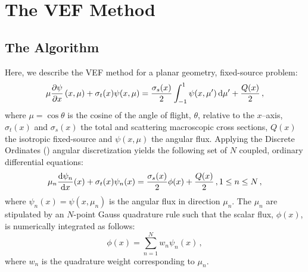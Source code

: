 
\newcommand{\rell}{^\ell} %
\newcommand{\relll}{^{\ell+1}} %
\newcommand{\rellh}{^{\ell+1/2}} %

\newcommand{\paren}[1]{\left(#1\right)} 
\newcommand{\br}[1]{\left[#1\right]}
\newcommand{\curl}[1]{\left\{#1\right\}}

\newcommand{\eddphi}[1]{\edd_{#1}\phi_{#1}}
\newcommand{\ALPHA}[2]{\frac{#1}{\sigma_{t,#2} h_{#2}}}

\section{The VEF Method}
\subsection{The Algorithm}
Here, we describe the VEF method for a planar geometry, fixed-source problem:
	\begin{equation} 
		\mu \pderiv{\psi}{x} \paren{x, \mu} + \sigma_t(x) \psi(x,\mu) = 
			\frac{\sigma_s(x)}{2} \int_{-1}^1 \psi(x,\mu') \ud \mu' + \frac{Q(x)}{2} \,,
	\end{equation}
where $\mu = \cos\theta$ is the cosine of the angle of flight, $\theta$, relative to the $x$--axis, $\sigma_t(x)$ and $\sigma_s(x)$ the total and scattering macroscopic cross sections, $Q(x)$ the isotropic fixed-source and $\psi(x, \mu)$ the angular flux. Applying the Discrete Ordinates (\SN) angular discretization yields the following set of $N$ coupled, ordinary differential equations: 
	\begin{equation} \label{eq:sn}
		\mu_n \frac{\mathop{}\!\mathrm{d} \psi_n}{\mathop{}\!\mathrm{d} x}(x) + \sigma_t(x) \psi_n(x) = 
		\frac{\sigma_s(x)}{2} \phi(x) + \frac{Q(x)}{2} \,, 1 \leq n \leq N \,,
	\end{equation}
where $\psi_n(x) = \psi(x, \mu_n)$ is the angular flux in direction $\mu_n$. The $\mu_n$ are stipulated by an $N$-point Gauss quadrature rule such that the scalar flux, $\phi(x)$, is numerically integrated as follows: 
	\begin{equation} \label{eq:phiquad}
		\phi(x) = \sum_{n=1}^N w_n \psi_n(x) \,,
	\end{equation}
where $w_n$ is the quadrature weight corresponding to $\mu_n$. 


